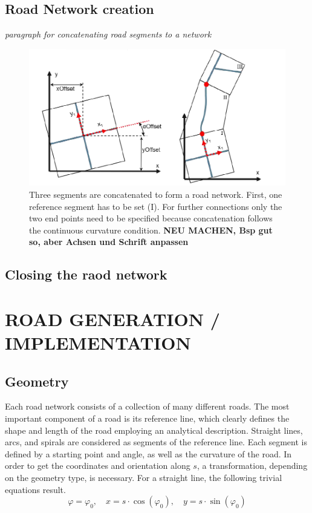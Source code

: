 \documentclass[a4paper, 10pt, conference]{ieeeconf}      %
\begin{document}
\subsection{Road Network creation}
\textit{paragraph for concatenating road segments to a network}
\begin{figure}[thpb] 		
	\centering
	\includegraphics[width=0.9\columnwidth]{fig/concatSegments.png}
	\caption{Three segments are concatenated to form a road network. First, one reference segment has to be set (I). For further connections only the two end points need to be specified because concatenation follows the continuous curvature condition. \textbf{NEU MACHEN, Bsp gut so, aber Achsen und Schrift anpassen}}
	\label{fig_concatSeg}
\end{figure}

\subsection{Closing the raod network}
\section{ROAD GENERATION / IMPLEMENTATION}

\subsection{Geometry}
    Each road network consists of a collection of many different roads. The most important component of a road is its reference line, which clearly defines the shape and length of the road employing an analytical description. Straight lines, arcs, and spirals are considered as segments of the reference line. Each segment is defined by a starting point and angle, as well as the curvature of the road. In order to get the coordinates and orientation along \(s\), a transformation, depending on the geometry type, is necessary. For a straight line, the following trivial equations result.
    \begin{equation}
        \varphi = \varphi_0, \quad x = s \cdot \cos(\varphi_0), \quad y = s \cdot \sin(\varphi_0)
    \end{equation}
\end{document}
